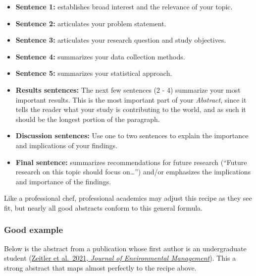 \documentclass[
]{book}
\providecommand{\tightlist}{%
  \setlength{\itemsep}{0pt}\setlength{\parskip}{0pt}}
\begin{document}
\begin{itemize}
\tightlist
\item
  \textbf{Sentence 1:} establishes broad interest and the relevance of your topic.\\
\item
  \textbf{Sentence 2:} articulates your problem statement.\\
\item
  \textbf{Sentence 3:} articulates your research question and study objectives.\\
\item
  \textbf{Sentence 4:} summarizes your data collection methods.\\
\item
  \textbf{Sentence 5:} summarizes your statistical approach.\\
\item
  \textbf{Results sentences:} The next few sentences (2 - 4) summarize your most important results. This is the most important part of your \emph{Abstract}, since it tells the reader what your study is contributing to the world, and as such it should be the longest portion of the paragraph.
\item
  \textbf{Discussion sentences:} Use one to two sentences to explain the importance and implications of your findings.\\
\item
  \textbf{Final sentence:} summarizes recommendations for future research (``Future research on this topic should focus on\ldots{}'') and/or emphasizes the implications and importance of the findings.
\end{itemize}

Like a professional chef, professional academics may adjust this recipe as they see fit, but nearly all good abstracts conform to this general formula.

\hypertarget{good-example}{%
\subsubsection*{Good example}\label{good-example}}

Below is the abstract from a publication whose first author is an undergraduate student (\href{https://www.sciencedirect.com/science/article/pii/S0301479721006332?casa_token=BhsD4GiVQhIAAAAA:78wrLH-vN5gUPvNdX16fyaoHJq8QVQpQ-mqVA6UqxpxLMOFKweuX0YwJtBMLMnmVnfU4e1k}{Zeitler et al.~2021, \emph{Journal of Environmental Management}}). This a strong abstract that maps almost perfectly to the recipe above.
\end{document}
